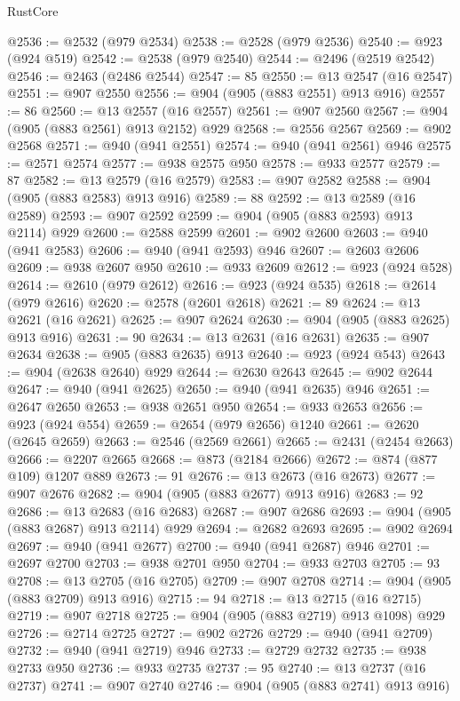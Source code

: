 \begin{lexlean}{RustCore}
\begin{coremodule}
@2536 := @2532 (@979 @2534)
@2538 := @2528 (@979 @2536)
@2540 := @923 (@924 @519)
@2542 := @2538 (@979 @2540)
@2544 := @2496 (@2519 @2542)
@2546 := @2463 (@2486 @2544)
@2547 := 85
@2550 := @13 @2547 (@16 @2547)
@2551 := @907 @2550
@2556 := @904 (@905 (@883 @2551) @913 @916)
@2557 := 86
@2560 := @13 @2557 (@16 @2557)
@2561 := @907 @2560
@2567 := @904 (@905 (@883 @2561) @913 @2152) @929
@2568 := @2556 @2567
@2569 := @902 @2568
@2571 := @940 (@941 @2551)
@2574 := @940 (@941 @2561) @946
@2575 := @2571 @2574
@2577 := @938 @2575 @950
@2578 := @933 @2577
@2579 := 87
@2582 := @13 @2579 (@16 @2579)
@2583 := @907 @2582
@2588 := @904 (@905 (@883 @2583) @913 @916)
@2589 := 88
@2592 := @13 @2589 (@16 @2589)
@2593 := @907 @2592
@2599 := @904 (@905 (@883 @2593) @913 @2114) @929
@2600 := @2588 @2599
@2601 := @902 @2600
@2603 := @940 (@941 @2583)
@2606 := @940 (@941 @2593) @946
@2607 := @2603 @2606
@2609 := @938 @2607 @950
@2610 := @933 @2609
@2612 := @923 (@924 @528)
@2614 := @2610 (@979 @2612)
@2616 := @923 (@924 @535)
@2618 := @2614 (@979 @2616)
@2620 := @2578 (@2601 @2618)
@2621 := 89
@2624 := @13 @2621 (@16 @2621)
@2625 := @907 @2624
@2630 := @904 (@905 (@883 @2625) @913 @916)
@2631 := 90
@2634 := @13 @2631 (@16 @2631)
@2635 := @907 @2634
@2638 := @905 (@883 @2635) @913
@2640 := @923 (@924 @543)
@2643 := @904 (@2638 @2640) @929
@2644 := @2630 @2643
@2645 := @902 @2644
@2647 := @940 (@941 @2625)
@2650 := @940 (@941 @2635) @946
@2651 := @2647 @2650
@2653 := @938 @2651 @950
@2654 := @933 @2653
@2656 := @923 (@924 @554)
@2659 := @2654 (@979 @2656) @1240
@2661 := @2620 (@2645 @2659)
@2663 := @2546 (@2569 @2661)
@2665 := @2431 (@2454 @2663)
@2666 := @2207 @2665
@2668 := @873 (@2184 @2666)
@2672 := @874 (@877 @109) @1207 @889
@2673 := 91
@2676 := @13 @2673 (@16 @2673)
@2677 := @907 @2676
@2682 := @904 (@905 (@883 @2677) @913 @916)
@2683 := 92
@2686 := @13 @2683 (@16 @2683)
@2687 := @907 @2686
@2693 := @904 (@905 (@883 @2687) @913 @2114) @929
@2694 := @2682 @2693
@2695 := @902 @2694
@2697 := @940 (@941 @2677)
@2700 := @940 (@941 @2687) @946
@2701 := @2697 @2700
@2703 := @938 @2701 @950
@2704 := @933 @2703
@2705 := 93
@2708 := @13 @2705 (@16 @2705)
@2709 := @907 @2708
@2714 := @904 (@905 (@883 @2709) @913 @916)
@2715 := 94
@2718 := @13 @2715 (@16 @2715)
@2719 := @907 @2718
@2725 := @904 (@905 (@883 @2719) @913 @1098) @929
@2726 := @2714 @2725
@2727 := @902 @2726
@2729 := @940 (@941 @2709)
@2732 := @940 (@941 @2719) @946
@2733 := @2729 @2732
@2735 := @938 @2733 @950
@2736 := @933 @2735
@2737 := 95
@2740 := @13 @2737 (@16 @2737)
@2741 := @907 @2740
@2746 := @904 (@905 (@883 @2741) @913 @916)

\end{coremodule}
\end{lexlean}

